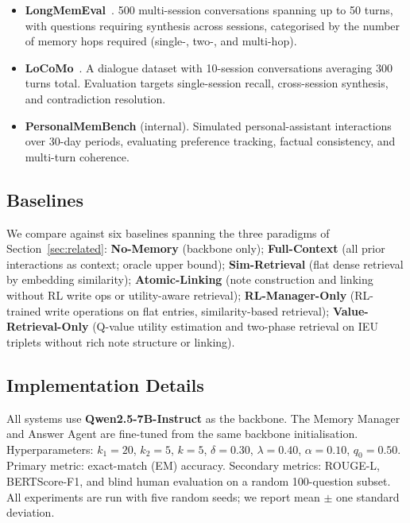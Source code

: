 \documentclass{article}
\begin{document}
\begin{itemize}[leftmargin=1.5em]

  \item \textbf{LongMemEval}~\cite{wu2024longmemeval}.
  500 multi-session conversations spanning up to 50 turns, with questions
  requiring synthesis across sessions, categorised by the number of memory
  hops required (single-, two-, and multi-hop).

  \item \textbf{LoCoMo}~\cite{maharana2024locomo}.
  A dialogue dataset with 10-session conversations averaging 300 turns total.
  Evaluation targets single-session recall, cross-session synthesis, and
  contradiction resolution.

  \item \textbf{PersonalMemBench} (internal).
  Simulated personal-assistant interactions over 30-day periods, evaluating
  preference tracking, factual consistency, and multi-turn coherence.

\end{itemize}

\subsection{Baselines}

We compare against six baselines spanning the three paradigms of
Section~\ref{sec:related}:
\textbf{No-Memory} (backbone only);
\textbf{Full-Context} (all prior interactions as context; oracle upper bound);
\textbf{Sim-Retrieval} (flat dense retrieval by embedding similarity);
\textbf{Atomic-Linking} (note construction and linking without RL write ops or
utility-aware retrieval);
\textbf{RL-Manager-Only} (RL-trained write operations on flat entries,
similarity-based retrieval);
\textbf{Value-Retrieval-Only} (Q-value utility estimation and two-phase
retrieval on IEU triplets without rich note structure or linking).

\subsection{Implementation Details}

All systems use \textbf{Qwen2.5-7B-Instruct} as the backbone.
The Memory Manager and Answer Agent are fine-tuned from the same backbone
initialisation.
Hyperparameters: $k_1=20$, $k_2=5$, $k=5$, $\delta=0.30$, $\lambda=0.40$,
$\alpha=0.10$, $q_0=0.50$.
Primary metric: exact-match (EM) accuracy.
Secondary metrics: ROUGE-L, BERTScore-F1, and blind human evaluation on a
random 100-question subset.
All experiments are run with five random seeds; we report mean $\pm$
one standard deviation.
\end{document}
